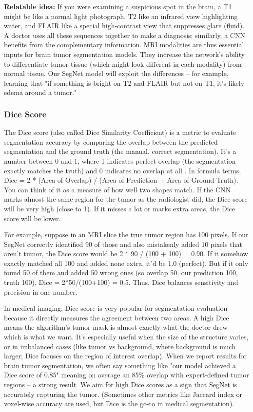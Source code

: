 \textbf{Relatable idea:} If you were examining a suspicious spot in the brain, a T1 might be like a normal light photograph, T2 like an infrared view highlighting water, and FLAIR like a special high-contrast view that suppresses glare (fluid). A doctor uses all these sequences together to make a diagnosis; similarly, a CNN benefits from the complementary information. MRI modalities are thus essential inputs for brain tumor segmentation models. They increase the network's ability to differentiate tumor tissue (which might look different in each modality) from normal tissue. Our SegNet model will exploit the differences – for example, learning that "if something is bright on T2 and FLAIR but not on T1, it's likely edema around a tumor."

\subsubsection{Dice Score}
\label{sec:dice_score}

The Dice score (also called Dice Similarity Coefficient) is a metric to evaluate segmentation accuracy by comparing the overlap between the predicted segmentation and the ground truth (the manual, correct segmentation). It's a number between 0 and 1, where 1 indicates perfect overlap (the segmentation exactly matches the truth) and 0 indicates no overlap at all \cite{oecd2023dice}. In formula terms, Dice = 2 * (Area of Overlap) / (Area of Prediction + Area of Ground Truth). You can think of it as a measure of how well two shapes match. If the CNN marks almost the same region for the tumor as the radiologist did, the Dice score will be very high (close to 1). If it misses a lot or marks extra areas, the Dice score will be lower.

For example, suppose in an MRI slice the true tumor region has 100 pixels. If our SegNet correctly identified 90 of those and also mistakenly added 10 pixels that aren't tumor, the Dice score would be 2 * 90 / (100 + 100) = 0.90. If it somehow exactly matched all 100 and added none extra, it'd be 1.0 (perfect). But if it only found 50 of them and added 50 wrong ones (so overlap 50, our prediction 100, truth 100), Dice = 2*50/(100+100) = 0.5. Thus, Dice balances sensitivity and precision in one number.

In medical imaging, Dice score is very popular for segmentation evaluation because it directly measures the agreement between two areas. A high Dice means the algorithm's tumor mask is almost exactly what the doctor drew – which is what we want. It's especially useful when the size of the structure varies, or in imbalanced cases (like tumor vs background, where background is much larger; Dice focuses on the region of interest overlap). When we report results for brain tumor segmentation, we often say something like "our model achieved a Dice score of 0.85" meaning on average an 85\% overlap with expert-defined tumor regions – a strong result. We aim for high Dice scores as a sign that SegNet is accurately capturing the tumor. (Sometimes other metrics like Jaccard index or voxel-wise accuracy are used, but Dice is the go-to in medical segmentation).

